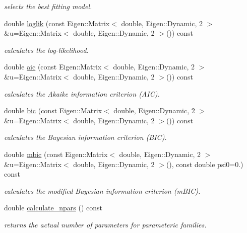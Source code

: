 \begin{DoxyCompactItemize}
\begin{DoxyCompactList}\small\item\em selects the best fitting model. \end{DoxyCompactList}\item 
double \hyperlink{classvinecopulib_1_1_bicop_a81979ae3578ec9af1f5f956751faa63d}{loglik} (const Eigen\+::\+Matrix$<$ double, Eigen\+::\+Dynamic, 2 $>$ \&u=Eigen\+::\+Matrix$<$ double, Eigen\+::\+Dynamic, 2 $>$()) const
\begin{DoxyCompactList}\small\item\em calculates the log-\/likelihood. \end{DoxyCompactList}\item 
double \hyperlink{classvinecopulib_1_1_bicop_a6d5907e8fcc38c3be57712a26b562a39}{aic} (const Eigen\+::\+Matrix$<$ double, Eigen\+::\+Dynamic, 2 $>$ \&u=Eigen\+::\+Matrix$<$ double, Eigen\+::\+Dynamic, 2 $>$()) const
\begin{DoxyCompactList}\small\item\em calculates the Akaike information criterion (A\+IC). \end{DoxyCompactList}\item 
double \hyperlink{classvinecopulib_1_1_bicop_a5ad96c73be4b32846792203a9dee1c53}{bic} (const Eigen\+::\+Matrix$<$ double, Eigen\+::\+Dynamic, 2 $>$ \&u=Eigen\+::\+Matrix$<$ double, Eigen\+::\+Dynamic, 2 $>$()) const
\begin{DoxyCompactList}\small\item\em calculates the Bayesian information criterion (B\+IC). \end{DoxyCompactList}\item 
double \hyperlink{classvinecopulib_1_1_bicop_a12e146f82646dbebcd12cccd82d91c00}{mbic} (const Eigen\+::\+Matrix$<$ double, Eigen\+::\+Dynamic, 2 $>$ \&u=Eigen\+::\+Matrix$<$ double, Eigen\+::\+Dynamic, 2 $>$(), const double psi0=0.) const
\begin{DoxyCompactList}\small\item\em calculates the modified Bayesian information criterion (m\+B\+IC). \end{DoxyCompactList}\item 
double \hyperlink{classvinecopulib_1_1_bicop_a8e6b3e3dd484d07cafeb24ca3393f5f0}{calculate\+\_\+npars} () const
\begin{DoxyCompactList}\small\item\em returns the actual number of parameters for parameteric families. \end{DoxyCompactList}\item 

\end{DoxyCompactItemize}
